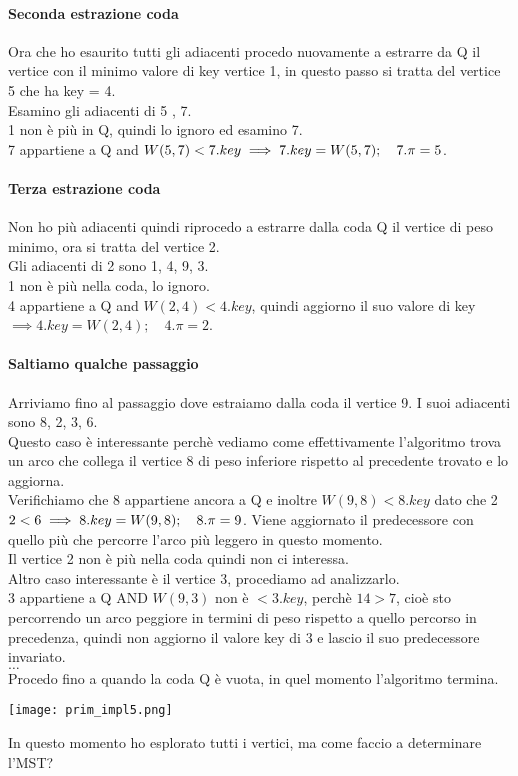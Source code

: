 \paragraph*{Seconda estrazione coda} Ora che ho esaurito tutti gli adiacenti procedo nuovamente a estrarre da Q il vertice
con il minimo valore di key \ra vertice 1, in questo passo si tratta del vertice 5 che ha
key = 4.\\
Esamino gli adiacenti di 5 , 7.\\ 
1 non è più in Q, quindi lo ignoro ed esamino 7.\\
7 appartiene a Q and $W(5,7) < 7.key \\
\implies 7.key = W(5,7); \quad 7.\pi = 5$.
\paragraph*{Terza estrazione coda} Non ho più adiacenti quindi riprocedo a estrarre dalla coda Q il vertice di peso minimo,
ora si tratta del vertice 2.\\
Gli adiacenti di 2 sono 1, 4, 9, 3.\\
1 non è più nella coda, lo ignoro.\\
4 appartiene a Q and $W(2,4) < 4.key$, quindi aggiorno il suo valore di key\\
$\implies 4.key = W(2,4); \quad 4.\pi = 2$.
\paragraph*{Saltiamo qualche passaggio} Arriviamo fino al passaggio dove estraiamo
dalla coda il vertice 9. I suoi adiacenti sono 8, 2, 3, 6.\\
Questo caso è interessante perchè vediamo come effettivamente l'algoritmo trova un arco
che collega il vertice 8 di peso inferiore rispetto al precedente trovato e lo aggiorna.\\
Verifichiamo che 8 appartiene ancora a Q e inoltre $W(9,8) < 8.key$ dato che 2 $2<6\\
\implies 8.key = W(9,8);\quad 8.\pi = 9$. Viene aggiornato il predecessore con quello più
che percorre l'arco più leggero in questo momento.\\
Il vertice 2 non è più nella coda quindi non ci interessa.\\
Altro caso interessante è il vertice 3, procediamo ad analizzarlo.\\
3 appartiene a Q AND $W(9,3)$ non è $< 3.key$, perchè $14>7$, cioè sto percorrendo un arco
peggiore in termini di peso rispetto a quello percorso in precedenza, quindi non aggiorno il valore
key di 3 e lascio il suo predecessore invariato.\\
$\dots$\\
Procedo fino a quando la coda Q è vuota, in quel momento l'algoritmo termina.
\begin{center}
    \texttt{[image: prim\_impl5.png]}
\end{center}
In questo momento ho esplorato tutti i vertici, ma come faccio a determinare l'MST?
